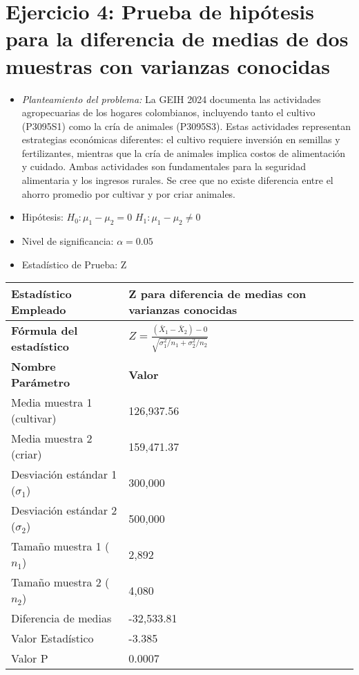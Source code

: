 \documentclass[12pt,a4paper]{article}
\begin{document}
\section*{Ejercicio 4: Prueba de hipótesis para la diferencia de medias de dos muestras con varianzas conocidas}
\begin{itemize}
    \item \textit{Planteamiento del problema:} La GEIH 2024 documenta las actividades agropecuarias de los hogares colombianos, incluyendo tanto el cultivo (P3095S1) como la cría de animales (P3095S3). Estas actividades representan estrategias económicas diferentes: el cultivo requiere inversión en semillas y fertilizantes, mientras que la cría de animales implica costos de alimentación y cuidado. Ambas actividades son fundamentales para la seguridad alimentaria y los ingresos rurales. Se cree que no existe diferencia entre el ahorro promedio por cultivar y por criar animales.
    \item Hipótesis: \quad $H_{0}: \mu_1 - \mu_2 = 0$ \hspace{2cm} $H_{1}: \mu_1 - \mu_2 \neq 0$
    \item Nivel de significancia: $\alpha = 0.05$
    \item Estadístico de Prueba: Z
\end{itemize}

\begin{tabular}{|m{7cm}|m{7cm}|}
\hline
\textbf{Estadístico Empleado} & Z para diferencia de medias con varianzas conocidas \\ \hline
\textbf{Fórmula del estadístico} & $Z = \frac{(\bar{X}_1 - \bar{X}_2) - 0}{\sqrt{\sigma_1^2/n_1 + \sigma_2^2/n_2}}$ \\ \hline
\textbf{Nombre Parámetro} & \textbf{Valor} \\ \hline
Media muestra 1 (cultivar) & 126,937.56 \\ \hline
Media muestra 2 (criar) & 159,471.37 \\ \hline
Desviación estándar 1 ($\sigma_1$) & 300,000 \\ \hline
Desviación estándar 2 ($\sigma_2$) & 500,000 \\ \hline
Tamaño muestra 1 ($n_1$) & 2,892 \\ \hline
Tamaño muestra 2 ($n_2$) & 4,080 \\ \hline
Diferencia de medias & -32,533.81 \\ \hline
Valor Estadístico & -3.385 \\ \hline
Valor P & 0.0007 \\ \hline
\end{tabular}
\end{document}
